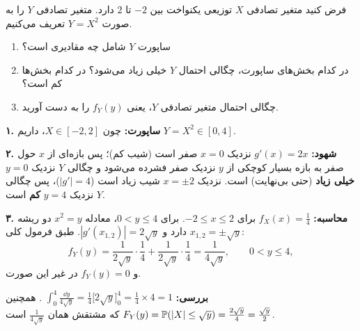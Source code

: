 \begin{example}
فرض کنید متغیر تصادفی $X$ توزیعی یکنواخت بین $-2$ تا $2$ دارد. متغیر تصادفی $Y$ را به صورت $Y=X^2$ تعریف می‌کنیم.
\begin{enumerate}
\item ساپورت $Y$ شامل چه مقادیری است؟
\item در کدام بخش‌های ساپورت، چگالی احتمال $Y$ خیلی زیاد می‌شود؟ در کدام بخش‌ها کم است؟
\item چگالی احتمال متغیر تصادفی $Y$، یعنی $f_Y(y)$ را به دست آورید.
\end{enumerate}
\begin{solution}
\textbf{۱. ساپورت:} چون $X\in[-2,2]$، داریم $Y=X^2\in[0,4]$.

\textbf{۲. شهود:} $g'(x)=2x$ نزدیک $x=0$ صفر است (شیب کم)؛ پس بازه‌ای از $x$ حول صفر به بازه بسیار کوچکی از $y$ نزدیک صفر فشرده می‌شود و چگالی $Y$ نزدیک $y=0$ \textbf{خیلی زیاد} (حتی بی‌نهایت) است. نزدیک $x=\pm2$ شیب زیاد است ($|g'|=4$)، پس چگالی $Y$ نزدیک $y=4$ \textbf{کم} است.

\textbf{۳. محاسبه:} $f_X(x)=\frac14$ برای $-2\le x\le2$. برای $0<y\le4$، معادله $x^2=y$ دو ریشه $x_{1,2}=\pm\sqrt y$ دارد و $|g'(x_{1,2})|=2\sqrt y$. طبق فرمول کلی:
\[
f_Y(y)=\frac{1}{2\sqrt y}\cdot\frac14+\frac{1}{2\sqrt y}\cdot\frac14=\frac{1}{4\sqrt y},\qquad0<y\le4,
\]
و $f_Y(y)=0$ در غیر این صورت.

\textbf{بررسی:} $\int_0^4\frac{\dd y}{4\sqrt y}=\frac14\big[2\sqrt y\big]_0^4=\frac14\times4=1$ \checkmark. همچنین $F_Y(y)=\mathbb{P}(|X|\le\sqrt y)=\frac{2\sqrt y}{4}=\frac{\sqrt y}{2}$ که مشتقش همان $\frac{1}{4\sqrt y}$ است.
\end{solution}
\end{example}

\begin{center}
\end{center}

